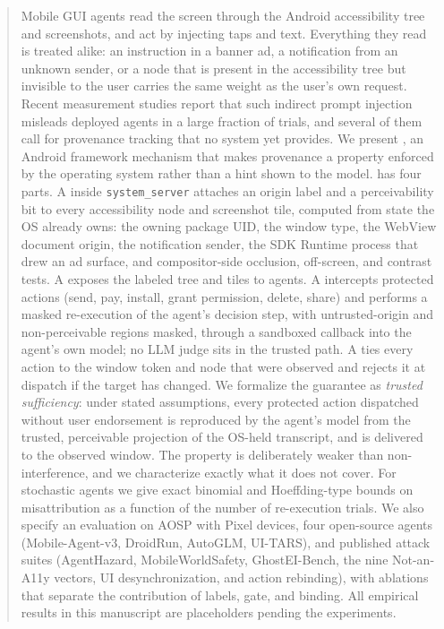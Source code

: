 \begin{abstract}
Mobile GUI agents read the screen through the Android accessibility tree and screenshots, and act by injecting taps and text. Everything they read is treated alike: an instruction in a banner ad, a notification from an unknown sender, or a node that is present in the accessibility tree but invisible to the user carries the same weight as the user's own request. Recent measurement studies report that such indirect prompt injection misleads deployed agents in a large fraction of trials, and several of them call for provenance tracking that no system yet provides. We present \PG{}, an Android framework mechanism that makes provenance a property enforced by the operating system rather than a hint shown to the model. \PG{} has four parts. A \LS{} inside \texttt{system\_server} attaches an origin label and a perceivability bit to every accessibility node and screenshot tile, computed from state the OS already owns: the owning package UID, the window type, the WebView document origin, the notification sender, the SDK Runtime process that drew an ad surface, and compositor-side occlusion, off-screen, and contrast tests. A \PA{} exposes the labeled tree and tiles to agents. A \CG{} intercepts protected actions (send, pay, install, grant permission, delete, share) and performs a masked re-execution of the agent's decision step, with untrusted-origin and non-perceivable regions masked, through a sandboxed callback into the agent's own model; no LLM judge sits in the trusted path. A \DB{} ties every action to the window token and node that were observed and rejects it at dispatch if the target has changed. We formalize the guarantee as \emph{trusted sufficiency}: under stated assumptions, every protected action dispatched without user endorsement is reproduced by the agent's model from the trusted, perceivable projection of the OS-held transcript, and is delivered to the observed window. The property is deliberately weaker than non-interference, and we characterize exactly what it does not cover. For stochastic agents we give exact binomial and Hoeffding-type bounds on misattribution as a function of the number of re-execution trials. We also specify an evaluation on AOSP with Pixel devices, four open-source agents (Mobile-Agent-v3, DroidRun, AutoGLM, UI-TARS), and published attack suites (AgentHazard, MobileWorldSafety, GhostEI-Bench, the nine Not-an-A11y vectors, UI desynchronization, and action rebinding), with ablations that separate the contribution of labels, gate, and binding. All empirical results in this manuscript are placeholders pending the experiments.
\end{abstract}

